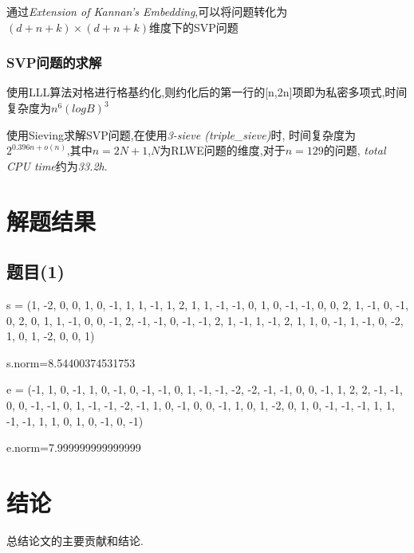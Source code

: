 \documentclass[12pt,a4paper]{article}
\numberwithin{equation}{section}
\begin{document}
通过\textit{Extension of Kannan’s Embedding}\cite{albrecht2018},可以将问题转化为$(d+n+k)×(d+n+k)$维度下的SVP问题

\subsubsection{SVP问题的求解}
使用LLL算法\cite{ajtai1998}对格进行格基约化,则约化后的第一行的[n,2n]项即为私密多项式,时间复杂度为$n^6 (logB)^3$\cite{adleman1981}

使用Sieving求解SVP问题,在使用\textit{3-sieve (triple\_sieve)}时,
时间复杂度为$2^{0.396n+o(n)}$,其中$n=2N+1$,$N$为RLWE问题的维度,对于$n=129$的问题,
\textit{total CPU time}约为\textit{33.2h}\cite{cryptoeprint:2019/089}.


\section{解题结果}

\subsection{题目(1)}


s = (1, -2, 0, 0, 1, 0, -1, 1, 1, -1, 1, 2, 1, 1,
-1, -1, 0, 1, 0, -1, -1, 0, 0, 2, 1, -1, 0, -1, 0, 2, 0, 1,
1, -1, 0, 0, -1, 2, -1, -1, 0, -1, -1, 2, 1, -1, 1, -1, 2, 1, 1, 0,
-1, 1, -1, 0, -2, 1, 0, 1, -2, 0, 0, 1)

s.norm=8.54400374531753

\hspace*{\fill}

e = (-1, 1, 0, -1, 1, 0, -1, 0, -1, -1, 0, 1, -1, -1, -2, -2, -1, -1, 0, 0, -1, 1, 2, 2, -1,
-1, 0, 0, -1, -1, 0, 1, -1, -1, -2, -1, 1, 0, -1, 0, 0, -1, 1, 0, 1, -2, 0, 1, 0, -1, -1,
-1, 1, 1, -1, -1, 1, 1, 0, 1, 0, -1, 0, -1)

e.norm=7.999999999999999

\section{结论}

总结论文的主要贡献和结论.

\vspace{1em}

{\songti\fontsize{12pt}{18pt}\selectfont
	
}
%
\end{document}
